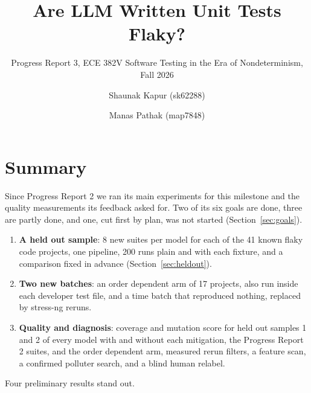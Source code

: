 \documentclass[sigconf,nonacm]{acmart}
\begin{document}
\sloppy

\title{Are LLM Written Unit Tests Flaky?}
\subtitle{Progress Report 3, ECE 382V Software Testing in the Era of Nondeterminism, Fall 2026}
\author{Shaunak Kapur (sk62288)}
\author{Manas Pathak (map7848)}
\maketitle

\section{Summary}
Since Progress Report 2 we ran its main experiments for this milestone and the quality measurements its feedback asked for. Two of its six goals are done, three are partly done, and one, cut first by plan, was not started (Section~\ref{sec:goals}).
\begin{enumerate}
\item \textbf{A held out sample}: 8 new suites per model for each of the 41 known flaky code projects, one pipeline, 200 runs plain and with each fixture, and a comparison fixed in advance (Section~\ref{sec:heldout}).
\item \textbf{Two new batches}: an order dependent arm of 17 projects, also run inside each developer test file, and a time batch that reproduced nothing, replaced by stress-ng reruns.
\item \textbf{Quality and diagnosis}: coverage and mutation score for held out samples 1 and 2 of every model with and without each mitigation, the Progress Report 2 suites, and the order dependent arm, measured rerun filters, a feature scan, a confirmed polluter search, and a blind human relabel.
\end{enumerate}
Four preliminary results stand out.
\end{document}
